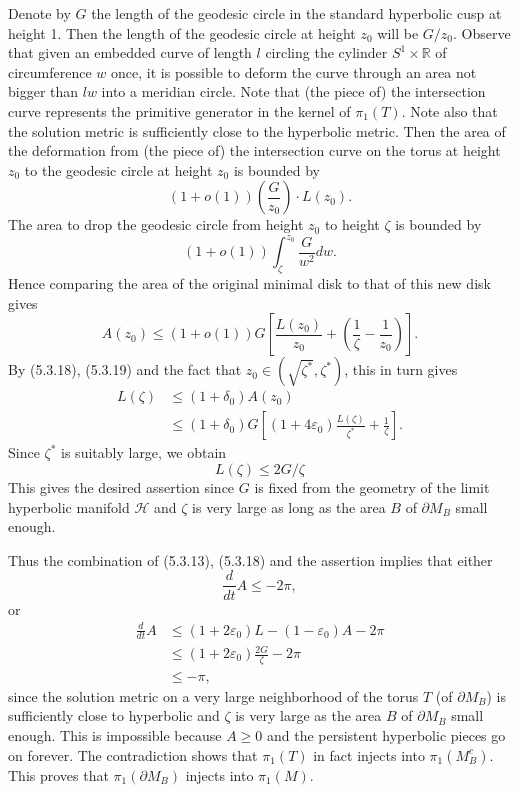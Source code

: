 Denote by $G$ the length of the geodesic circle in the standard
hyperbolic cusp at height 1. Then the length of the geodesic
circle at height $z_0$ will be $G/z_0$. Observe that given an
embedded curve of length $l$ circling the cylinder $S^1\times
\mathbb{R}$ of circumference $w$ once, it is possible to deform
the curve through an area not bigger than $lw$ into a meridian
circle. Note that (the piece of) the intersection curve represents
the primitive generator in the kernel of $\pi_1(T)$. Note also
that the solution metric is sufficiently close to the hyperbolic
metric. Then the area of the deformation from (the piece of) the
intersection curve on the torus at height $z_0$ to the geodesic
circle at height $z_0$ is bounded by
$$
(1+o(1))\left(\frac{G}{z_0}\right)\cdot L(z_0).
$$
The area to drop the geodesic circle from height $z_0$ to height
$\zeta$ is bounded by
$$
(1+o(1))\int_{\zeta}^{z_0}\frac{G}{w^2}dw.
$$
Hence comparing the area of the original minimal disk to that of
this new disk gives
$$
A(z_0)\leq (1+o(1))G\left[\frac{L(z_0)}{z_0}
+\left(\frac{1}{\zeta}-\frac{1}{z_0}\right)\right].
$$
By (5.3.18), (5.3.19) and the fact that
$z_0\in(\sqrt{\zeta^{\ast}},\zeta^{\ast})$, this in turn gives
\begin{align*}
L(\zeta)&  \leq (1+\delta_0)A(z_0) \\
&  \leq(1+\delta_0)G
\left[(1+4\varepsilon_0)\frac{L(\zeta)}{\zeta^{\ast}}+\frac{1}{\zeta}\right].
\end{align*}
Since $\zeta^{\ast}$ is suitably large, we obtain
$$
L(\zeta)\leq 2G/\zeta
$$
This gives the desired assertion since $G$ is fixed from the
geometry of the limit hyperbolic manifold $\mathcal{H}$ and
$\zeta$ is very large as long as the area $B$ of $\partial M_B$
small enough.

Thus the combination of (5.3.13), (5.3.18) and the assertion
implies that either
$$
\frac{d}{dt}A\leq-2\pi,
$$
or
\begin{align*}
\frac{d}{dt}A&  \leq (1+2\varepsilon_0)L-(1-\varepsilon_0)A-2\pi\\
&  \leq (1+2\varepsilon_0)\frac{2G}{\zeta} - 2\pi\\
&  \leq  -\pi,
\end{align*}
since the solution metric on a very large neighborhood of the
torus $T$ (of $\partial {M}_B$) is sufficiently close to
hyperbolic and $\zeta$ is very large as the area $B$ of $\partial
M_B$ small enough. This is impossible because $A\geq 0$ and the
persistent hyperbolic pieces go on forever. The contradiction
shows that $\pi_1(T)$ in fact injects into $\pi_1(M_B^c)$. This
proves that $\pi_1(\partial{M}_B) $ injects into $\pi_1(M)$.

